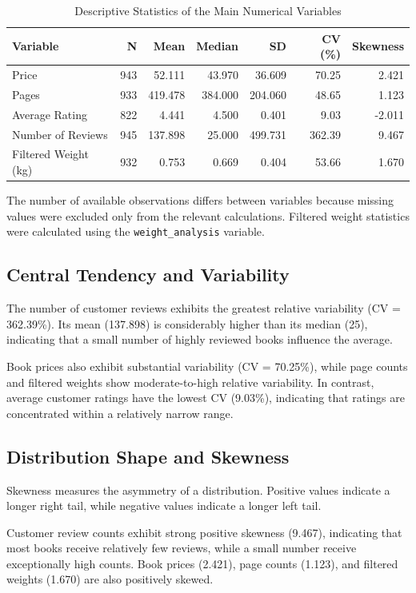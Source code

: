 \documentclass[11pt,a4paper]{article}
\begin{document}
\begin{table}[H]
\centering
\small
\begin{tabular}{lrrrrrr}
\toprule
Variable & N & Mean & Median & SD & CV (\%) & Skewness \\
\midrule
Price & 943 & 52.111 & 43.970 & 36.609 & 70.25 & 2.421 \\
Pages & 933 & 419.478 & 384.000 & 204.060 & 48.65 & 1.123 \\
Average Rating & 822 & 4.441 & 4.500 & 0.401 & 9.03 & -2.011 \\
Number of Reviews & 945 & 137.898 & 25.000 & 499.731 & 362.39 & 9.467 \\
Filtered Weight (kg) & 932 & 0.753 & 0.669 & 0.404 & 53.66 & 1.670 \\
\bottomrule
\end{tabular}
\caption{Descriptive Statistics of the Main Numerical Variables}
\label{tab:descriptive}
\end{table}

The number of available observations differs between variables
because missing values were excluded only from the relevant
calculations. Filtered weight statistics were calculated using
the \texttt{weight\_analysis} variable.
\subsection{Central Tendency and Variability}
The number of customer reviews exhibits the greatest relative
variability (CV = 362.39\%). Its mean (137.898) is considerably
higher than its median (25), indicating that a small number of
highly reviewed books influence the average.

Book prices also exhibit substantial variability (CV = 70.25\%),
while page counts and filtered weights show moderate-to-high
relative variability. In contrast, average customer ratings
have the lowest CV (9.03\%), indicating that ratings are
concentrated within a relatively narrow range.

\subsection{Distribution Shape and Skewness}

Skewness measures the asymmetry of a distribution.
Positive values indicate a longer right tail, while
negative values indicate a longer left tail.

Customer review counts exhibit strong positive skewness
(9.467), indicating that most books receive relatively
few reviews, while a small number receive exceptionally
high counts. Book prices (2.421), page counts (1.123),
and filtered weights (1.670) are also positively skewed.
\end{document}
